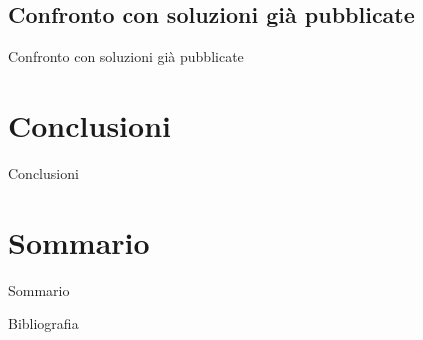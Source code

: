 \documentclass{beamer}
\begin{document}
\subsection{Confronto con soluzioni già pubblicate}
\begin{frame}{Confronto con soluzioni già pubblicate}

\end{frame}


\section{Conclusioni}
\begin{frame}{Conclusioni}

\end{frame}

\section{Sommario}
\begin{frame}{Sommario}

\end{frame}

\begin{frame}{Bibliografia}
	\printbibliography
\end{frame}
\end{document}
